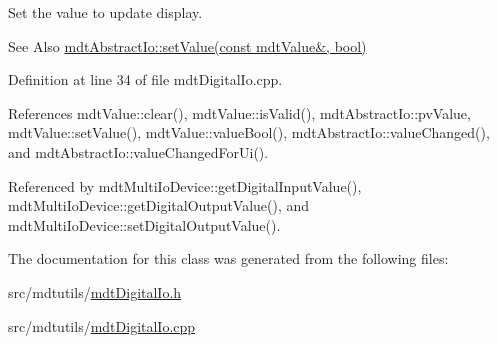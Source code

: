 Set the value to update display. 

\begin{DoxySeeAlso}{See Also}
\hyperlink{classmdt_abstract_io_a3f5fc9ed13c2ec2aad0987cd15d95e31}{mdt\-Abstract\-Io\-::set\-Value(const mdt\-Value\&, bool)} 
\end{DoxySeeAlso}


Definition at line 34 of file mdt\-Digital\-Io.\-cpp.



References mdt\-Value\-::clear(), mdt\-Value\-::is\-Valid(), mdt\-Abstract\-Io\-::pv\-Value, mdt\-Value\-::set\-Value(), mdt\-Value\-::value\-Bool(), mdt\-Abstract\-Io\-::value\-Changed(), and mdt\-Abstract\-Io\-::value\-Changed\-For\-Ui().



Referenced by mdt\-Multi\-Io\-Device\-::get\-Digital\-Input\-Value(), mdt\-Multi\-Io\-Device\-::get\-Digital\-Output\-Value(), and mdt\-Multi\-Io\-Device\-::set\-Digital\-Output\-Value().



The documentation for this class was generated from the following files\-:\begin{DoxyCompactItemize}
\item 
src/mdtutils/\hyperlink{mdt_digital_io_8h}{mdt\-Digital\-Io.\-h}\item 
src/mdtutils/\hyperlink{mdt_digital_io_8cpp}{mdt\-Digital\-Io.\-cpp}\end{DoxyCompactItemize}

